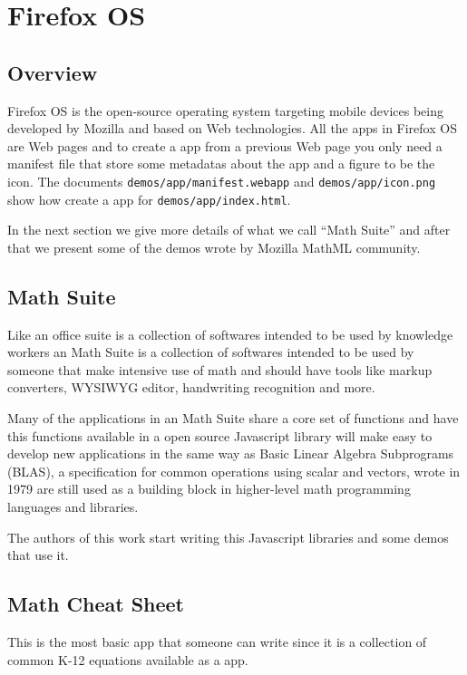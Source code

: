 \chapter{Firefox OS}

\section{Overview}

Firefox OS is the open-source operating system targeting mobile devices being
developed by Mozilla and based on Web technologies. All the apps in Firefox OS
are Web pages and to create a app from a previous Web page you only need a manifest
file that store some metadatas about the app and a figure to be the icon. The
documents {\tt demos/app/manifest.webapp} and {\tt demos/app/icon.png} show how
create a app for {\tt demos/app/index.html}.

In the next section we give more details of what we call ``Math Suite'' and
after that we present some of the demos wrote by Mozilla MathML community.

\section{Math Suite}

Like an office suite is a collection of softwares intended to be used by
knowledge workers an Math Suite is a collection of softwares intended to be used
by someone that make intensive use of math and should have tools like markup
converters, WYSIWYG editor, handwriting recognition and more.

Many of the applications in an Math Suite share a core set of functions and have
this functions available in a open source Javascript library will make easy to
develop new applications in the same way as Basic Linear Algebra Subprograms
(BLAS), a specification for common operations using scalar and vectors, wrote in
1979 are still used as a building block in higher-level math programming
languages and libraries.

The authors of this work start writing this Javascript libraries
and some demos that use it.

\section{Math Cheat Sheet}

This is the most basic app that someone can write since it
is a collection of common K-12 equations available as a app.

